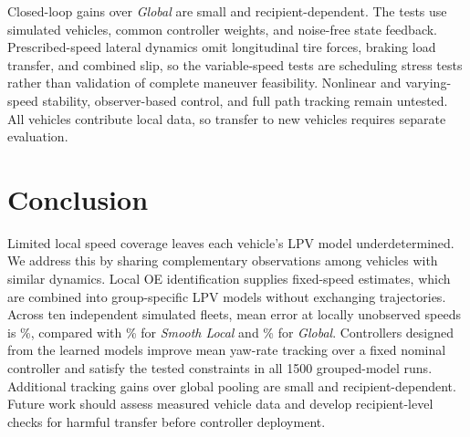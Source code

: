 \documentclass[conference]{IEEEtran}
\newcommand{\rev}[1]{\textcolor{revisiongreen}{#1}}
\newcommand{\revred}[1]{\textcolor{revisionred}{#1}}
\newcommand{\method}[1]{\textit{#1}}
\newcommand{\SmoothLocal}{\method{Smooth Local}}
\newcommand{\GlobalModel}{\method{Global}}
\begin{document}
\rev{Closed-loop gains over \GlobalModel{} are small and recipient-dependent.
The tests use simulated vehicles, common controller weights, and noise-free
state feedback}.
Prescribed-speed \rev{lateral dynamics omit} longitudinal tire forces, braking
load transfer, and combined slip, \rev{so the variable-speed tests} are \rev{scheduling
stress tests rather than validation of complete maneuver feasibility.
Nonlinear and} varying-speed stability, \rev{observer-based control}, and \rev{full path
tracking remain untested. All vehicles contribute local data}, so transfer
to new vehicles \rev{requires separate evaluation}.
\endgroup

\section{Conclusion}
\begingroup
\revred{Limited local speed coverage leaves each vehicle's LPV model underdetermined.
We address this by sharing complementary observations among vehicles with similar
dynamics. Local OE identification supplies fixed-speed estimates, which are combined
into group-specific LPV models without exchanging trajectories.}
Across ten independent simulated fleets, mean error at locally unobserved
speeds is \OEFederatedUnseen\%, compared with \OESmoothLocalUnseen\%
for \SmoothLocal{} and \OEGlobalUnseen\% for \GlobalModel{}.
\rev{Controllers designed from the learned models improve mean yaw-rate tracking
over a fixed nominal controller} and satisfy the tested constraints in all
1500 \rev{grouped-model runs}. \revred{Additional tracking gains over global pooling
are small and recipient-dependent.} Future work should assess measured vehicle data
and develop recipient-level checks for harmful transfer before \rev{controller} deployment.
\endgroup
\end{document}
